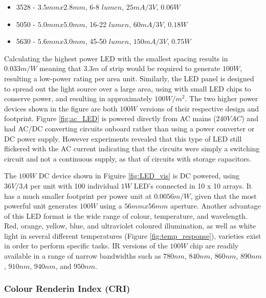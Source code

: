 \documentclass[fleqn,twoside]{article}
\begin{document}
\begin{itemize}
	\item 3528 - $3.5mm x 2.8mm$, 6-8 $lumen$, $25mA/3V$, $0.06W$
	\item 5050 - $5.0mm x 5.0mm$, 16-22 $lumen$, $60mA/3V$, $0.18W$
	\item 5630 - $5.6mm x 3.0mm$, 45-50 $lumen$, $150mA/3V$, $0.75W$
\end{itemize}
 
Calculating the highest power LED with the smallest spacing results in $0.033m/W$ meaning that $3.3m$ of strip would be required to generate $100W$, resulting a low-power rating per area unit. Similarly, the LED panel is designed to spread out the light source over a large area, using with small LED chips to conserve power, and resulting in approximately $100W/m^2$. The two higher power devices shown in the figure are both $100W$ versions of their respective design and footprint. Figure \ref{fig:ac_LED} is powered directly from AC mains ($240VAC$) and had AC/DC converting circuits onboard rather than using a power converter or DC power supply. However experiments revealed that this type of LED still flickered with the AC current indicating that the circuits were simply a switching circuit and not a continuous supply, as that of circuits with storage capacitors. 

The $100W$ DC device shown in Figuire \ref{fig:LED_vis} is DC powered, using $36V/3A$ per unit with 100 individual $1W$ LED's connected in 10 x 10 arrays. It has a much smaller footprint per power unit at $0.0056m/W$, given that the most powerful unit generates $100W$ using a $56mmx56mm$ aperture. Another advantage of this LED format is the wide range of colour, temperature, and wavelength. Red, orange, yellow, blue, and ultraviolet coloured illumination, as well as white light in several different temperatures (Figure \ref{fig:temp_response}), varieties exist in order to perform specific tasks. IR versions of the $100W$ chip are readily available in a range of narrow bandwidths such as $780nm$, $840nm$, $860nm$, $890nm$, $910nm$, $940nm$, and $950nm$. 

\subsubsection{Colour Renderin Index (CRI)}
\end{document}
